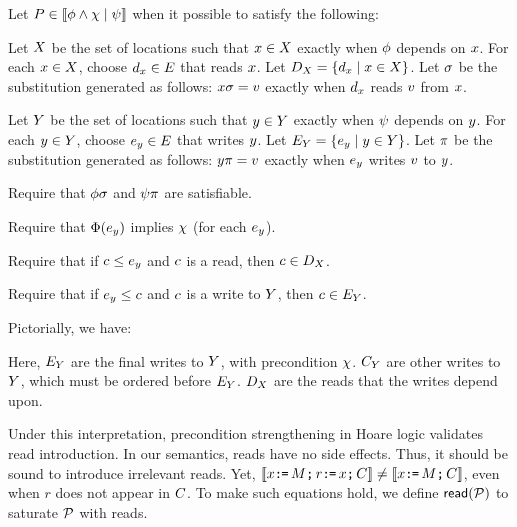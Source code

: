 \begin{definition}
  \label{def:prepost}
  Let $P\in\llbracket\phi\land\chi\mid\psi\rrbracket$
  when it possible to satisfy the following:

  Let $X$ be the set of locations such that $x\in X$ exactly
  when $\phi$ depends on $x$.  For each $x\in X$, choose
  $d_x\in E$ that reads $x$.
  Let $D_X=\{d_x\mid x\in X\}$.
  Let $\sigma$ be the substitution generated %
  as follows:
  $x\sigma = v$ exactly when $d_x$ reads $v$ from $x$.

  Let $Y$ be the set of locations such that $y\in Y$ exactly
  when $\psi$ depends on $y$.  For each $y\in Y$, choose
  $e_y\in E$ that writes $y$.
  Let $E_Y=\{e_y\mid y\in Y\}$.
  Let $\pi$ be the substitution generated %
  as follows:
  $y\pi = v$ exactly when $e_y$ writes $v$ to $y$.

  Require that $\phi\sigma$ and $\psi\pi$ are satisfiable.

  Require that $\Phi(e_y)$ implies $\chi$ (for each $e_y$).
  
  Require that if $c\le e_y$ and $c$ is a read, then $c\in D_X$.

  Require that if $e_y\le c$ and $c$ is a write to $Y$, then $c\in E_Y$.
\end{definition}
Pictorially, we have:
\begin{tikzdisplay}[node distance=.1ex and 2em]
\end{tikzdisplay}
Here, $E_Y$ are the final writes to $Y$, with precondition $\chi$.
$C_Y$ are other writes to $Y$, which must be ordered before $E_Y$.
$D_X$ are the reads that the writes depend upon.

Under this interpretation, precondition strengthening in Hoare logic
validates read introduction.  In our semantics, reads have no side effects.
Thus, it should be sound to introduce irrelevant reads.  Yet,
$\llbracket x\texttt{:}\mkern-1mu\texttt{=}\,M\texttt{;}\,\allowbreak r\texttt{:}\mkern-1mu\texttt{=}\, x\texttt{;}\,\allowbreak C\rrbracket\neq \llbracket x\texttt{:}\mkern-1mu\texttt{=}\,M\texttt{;}\,\allowbreak C\rrbracket$, even when $r$ does not appear in
$C$.  To make such equations hold, we define ${\mathsf{read}}(\mathcal{P})$ to saturate
$\mathcal{P}$ with reads.

